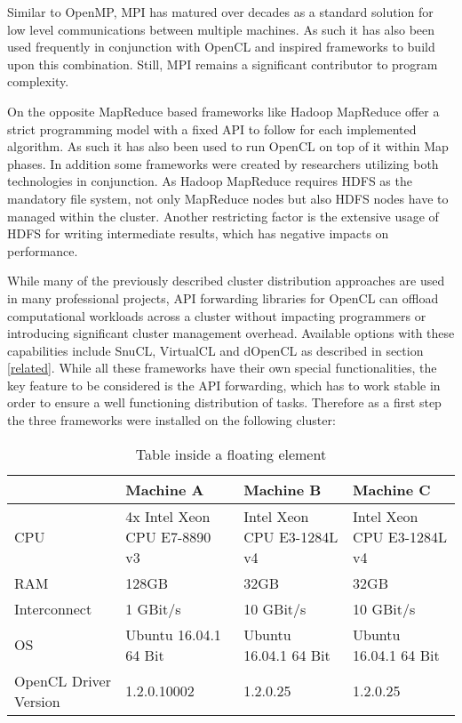 Similar to OpenMP, MPI has matured over decades as a standard solution for low level communications between multiple machines. As such it has also been used frequently in conjunction with OpenCL and inspired frameworks to build upon this combination. Still, MPI remains a significant contributor to program complexity.

On the opposite MapReduce based frameworks like Hadoop MapReduce offer a strict programming model with a fixed API to follow for each implemented algorithm. As such it has also been used to run OpenCL on top of it within Map phases. In addition some frameworks were created by researchers utilizing both technologies in conjunction. As Hadoop MapReduce requires HDFS as the mandatory file system, not only MapReduce nodes but also HDFS nodes have to managed within the cluster. Another restricting factor is the extensive usage of HDFS for writing intermediate results, which has negative impacts on performance.

While many of the previously described cluster distribution approaches are used in many professional projects, API forwarding libraries for OpenCL can offload computational workloads across a cluster without impacting programmers or introducing significant cluster management overhead. Available options with these capabilities include SnuCL, VirtualCL and dOpenCL as described in section \ref{related}. While all these frameworks have their own special functionalities, the key feature to be considered is the API forwarding, which has to work stable in order to ensure a well functioning distribution of tasks. Therefore as a first step the three frameworks were installed on the following cluster:

\begin{table}[htb]
  \centering
    \begin{adjustbox}{width=1\textwidth}
    \small
    \begin{tabular}{l | l | l | l}
    ~                     & Machine A                    & Machine B                  & Machine C                  \\
    \hline
    CPU                   & 4x Intel Xeon CPU E7-8890 v3 & Intel Xeon CPU E3-1284L v4 & Intel Xeon CPU E3-1284L v4 \\
    RAM                   & 128GB                        & 32GB                       & 32GB                       \\
    Interconnect          & 1 GBit/s                     & 10 GBit/s                  & 10 GBit/s                  \\
    OS                    & Ubuntu 16.04.1 64 Bit        & Ubuntu 16.04.1 64 Bit      & Ubuntu 16.04.1 64 Bit      \\
    OpenCL Driver Version & 1.2.0.10002                  & 1.2.0.25                   & 1.2.0.25                   \\
    \end{tabular}
    \end{adjustbox}

    \caption{Table inside a floating element}
    \label{table:ta}
\end{table}

